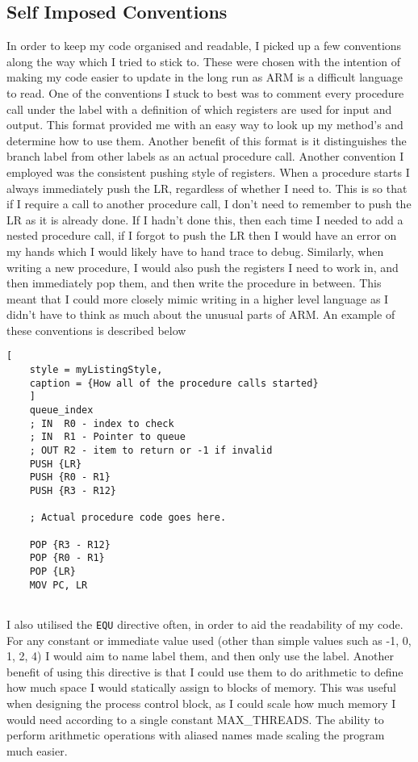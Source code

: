 \subsection{Self Imposed Conventions}
In order to keep my code organised and readable, I picked up a few conventions along the way which I tried to stick to. These were chosen with the intention of making my code easier to update in the long run as ARM is a difficult language to read. One of the conventions I stuck to best was to comment every procedure call under the label with a definition of which registers are used for input and output. This format provided me with an easy way to look up my method's and determine how to use them. Another benefit of this format is it distinguishes the branch label from other labels as an actual procedure call. Another convention I employed was the consistent pushing style of registers. When a procedure starts I always immediately push the LR, regardless of whether I need to. This is so that if I require a call to another procedure call, I don't need to remember to push the LR as it is already done. If I hadn't done this, then each time I needed to add a nested procedure call, if I forgot to push the LR then I would have an error on my hands which I would likely have to hand trace to debug. Similarly, when writing a new procedure, I would also push the registers I need to work in, and then immediately pop them, and then write the procedure in between. This meant that I could more closely mimic writing in a higher level language as I didn't have to think as much about the unusual parts of ARM. An example of these conventions is described below
\pagebreak
\begin{lstlisting}[
	style = myListingStyle,
	caption = {How all of the procedure calls started}
	]
	queue_index
	; IN  R0 - index to check
	; IN  R1 - Pointer to queue
	; OUT R2 - item to return or -1 if invalid
	PUSH {LR}
	PUSH {R0 - R1}
	PUSH {R3 - R12}
	
	; Actual procedure code goes here.	
	
	POP {R3 - R12}
	POP {R0 - R1}
	POP {LR}
	MOV PC, LR
	
\end{lstlisting}
I also utilised the \verb|EQU| directive often, in order to aid the readability of my code. For any constant or immediate value used (other than simple values such as -1, 0, 1, 2, 4) I would aim to name label them, and then only use the label. Another benefit of using this directive is that I could use them to do arithmetic to define how much space I would statically assign to blocks of memory. This was useful when designing the process control block, as I could scale how much memory I would need according to a single constant MAX\_THREADS. The ability to perform arithmetic operations with aliased names made scaling the program much easier. 
